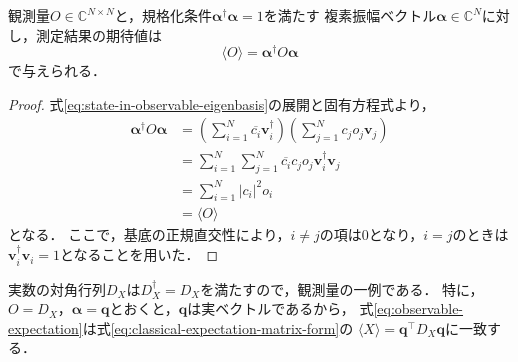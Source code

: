 \begin{prop}[観測量の期待値]
\label{prop:observable-expectation}
観測量$O\in\mathbb C^{N\times N}$と，規格化条件$\bm{\alpha}^{\dagger}\bm{\alpha}=1$を満たす
複素振幅ベクトル$\bm{\alpha}\in\mathbb C^N$に対し，測定結果の期待値は
\begin{equation}
  \langle O\rangle=\bm{\alpha}^{\dagger}O\bm{\alpha}
  \label{eq:observable-expectation}
\end{equation}
で与えられる\cite[p.~95]{schuld2020}．
\end{prop}
\begin{proof}
式\eqref{eq:state-in-observable-eigenbasis}の展開と固有方程式より，
\begin{equation*}
  \begin{aligned}
    \bm{\alpha}^{\dagger}O\bm{\alpha}
    &=\left(\sum_{i=1}^{N}\overline{c_i}\bm{v}_i^{\dagger}\right)
      \left(\sum_{j=1}^{N}c_j o_j\bm{v}_j\right)\\
    &=\sum_{i=1}^{N}\sum_{j=1}^{N}
      \overline{c_i}c_j o_j\bm{v}_i^{\dagger}\bm{v}_j\\
    &=\sum_{i=1}^{N}|c_i|^2o_i\\
    &=\langle O\rangle
  \end{aligned}
\end{equation*}
となる．
ここで，基底の正規直交性により，$i\ne j$の項は$0$となり，$i=j$のときは
$\bm{v}_i^{\dagger}\bm{v}_i=1$となることを用いた．
\end{proof}

実数の対角行列$D_X$は$D_X^{\dagger}=D_X$を満たすので，観測量の一例である．
特に，$O=D_X$，$\bm{\alpha}=\bm{q}$とおくと，$\bm{q}$は実ベクトルであるから，
式\eqref{eq:observable-expectation}は式\eqref{eq:classical-expectation-matrix-form}の
$\langle X\rangle=\bm{q}^{\top}D_X\bm{q}$に一致する．



